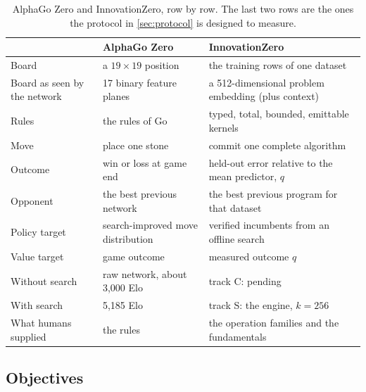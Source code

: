 \begin{table}[t]
\caption{AlphaGo Zero and InnovationZero, row by row. The last two rows are the ones the protocol
in \cref{sec:protocol} is designed to measure.}
\label{tab:go}
\centering\tablesf
\begin{tabularx}{\linewidth}{@{}lLL@{}}
\toprule
& AlphaGo Zero & InnovationZero \\
\midrule
Board & a $19\times19$ position & the training rows of one dataset \\
Board as seen by the network & 17 binary feature planes & a 512-dimensional problem embedding (plus context) \\
Rules & the rules of Go & typed, total, bounded, emittable kernels \\
Move & place one stone & commit one complete algorithm \\
Outcome & win or loss at game end & held-out error relative to the mean predictor, $q$ \\
Opponent & the best previous network & the best previous program for that dataset \\
Policy target & search-improved move distribution & verified incumbents from an offline search \\
Value target & game outcome & measured outcome $q$ \\
Without search & raw network, about 3,000 Elo & track C: pending \\
With search & 5,185 Elo & track S: the engine, $k=256$ \\
What humans supplied & the rules & the operation families and the fundamentals \\
\bottomrule
\end{tabularx}
\end{table}

\subsection{Objectives}

